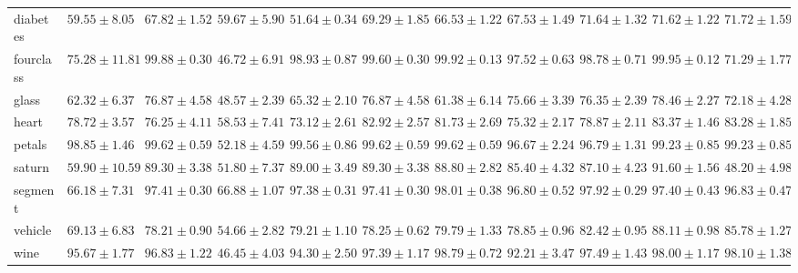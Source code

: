 \begin{sidewaystable}
\begin{tabular}{l||l|l|l|l|l|l|l|l|l|l|}
diabetes& $59.55\pm8.05$& $67.82\pm1.52$& $59.67\pm5.90$& $51.64\pm0.34$& $69.29\pm1.85$& $66.53\pm1.22$& $67.53\pm1.49$& $\mathbf{71.64\pm1.32}$& $\mathbf{71.62\pm1.22}$& $\mathbf{71.72\pm1.59}$\\ 
fourclass& $75.28\pm11.81$& $\mathbf{99.88\pm0.30}$& $46.72\pm6.91$& $98.93\pm0.87$& $99.60\pm0.30$& $\mathbf{99.92\pm0.13}$& $97.52\pm0.63$& $98.78\pm0.71$& $\mathbf{99.95\pm0.12}$& $71.29\pm1.77$\\ 
glass& $62.32\pm6.37$& $76.87\pm4.58$& $48.57\pm2.39$& $65.32\pm2.10$& $76.87\pm4.58$& $61.38\pm6.14$& $75.66\pm3.39$& $76.35\pm2.39$& $\mathbf{78.46\pm2.27}$& $72.18\pm4.28$\\ 
heart& $78.72\pm3.57$& $76.25\pm4.11$& $58.53\pm7.41$& $73.12\pm2.61$& $82.92\pm2.57$& $81.73\pm2.69$& $75.32\pm2.17$& $78.87\pm2.11$& $\mathbf{83.37\pm1.46}$& $\mathbf{83.28\pm1.85}$\\ 
petals& $98.85\pm1.46$& $\mathbf{99.62\pm0.59}$& $52.18\pm4.59$& $\mathbf{99.56\pm0.86}$& $\mathbf{99.62\pm0.59}$& $\mathbf{99.62\pm0.59}$& $96.67\pm2.24$& $96.79\pm1.31$& $99.23\pm0.85$& $99.23\pm0.85$\\ 
saturn& $59.90\pm10.59$& $89.30\pm3.38$& $51.80\pm7.37$& $89.00\pm3.49$& $89.30\pm3.38$& $88.80\pm2.82$& $85.40\pm4.32$& $87.10\pm4.23$& $\mathbf{91.60\pm1.56}$& $48.20\pm4.98$\\ 
segment& $66.18\pm7.31$& $97.41\pm0.30$& $66.88\pm1.07$& $97.38\pm0.31$& $97.41\pm0.30$& $\mathbf{98.01\pm0.38}$& $96.80\pm0.52$& $\mathbf{97.92\pm0.29}$& $97.40\pm0.43$& $96.83\pm0.47$\\ 
vehicle& $69.13\pm6.83$& $78.21\pm0.90$& $54.66\pm2.82$& $79.21\pm1.10$& $78.25\pm0.62$& $79.79\pm1.33$& $78.85\pm0.96$& $82.42\pm0.95$& $\mathbf{88.11\pm0.98}$& $85.78\pm1.27$\\ 
wine& $95.67\pm1.77$& $96.83\pm1.22$& $46.45\pm4.03$& $94.30\pm2.50$& $97.39\pm1.17$& $\mathbf{98.79\pm0.72}$& $92.21\pm3.47$& $97.49\pm1.43$& $98.00\pm1.17$& $98.10\pm1.38$
\end{tabular}
\end{sidewaystable}

